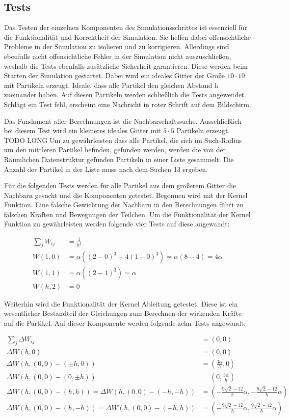 \documentclass[a4paper, 12pt]{article}
\begin{document}
\subsection{Tests}
Das Testen der einzelnen Komponenten des Simulationsschrittes ist essenziell für die Funktionalität und Korrektheit der Simulation. Sie helfen dabei offensichtliche Probleme in der Simulation zu isolieren und zu korrigieren. Allerdings sind ebenfalls nicht offensichtliche Fehler in der Simulation nicht auszuschließen, weshalb die Tests ebenfalls zusätzliche Sicherheit garantieren. Diese werden beim Starten der Simulation gestartet. Dabei wird ein ideales Gitter der Größe  $10 \cdot 10$  mit Partikeln erzeugt. \glqq Ideale\grqq{}, dass alle Partikel den gleichen Abstand h zueinander haben. Auf diesen Partikeln werden schließlich die Tests angewendet. Schlägt ein Test fehl, erscheint eine Nachricht in roter Schrift auf dem Bildschirm. 

Das Fundament aller Berechnungen ist die Nachbarschaftssuche. Ausschließlich bei diesem Test wird ein kleineres ideales Gitter mit $5 \cdot 5$ Partikeln erzeugt. TODO LONG Um zu gewährleisten dass alle Partikel, die sich im Such-Radius um den mittleren Partikel befinden, gefunden werden, werden die von der Räumlichen Datenstruktur gefunden Partikeln in einer Liste gesammelt. Die Anzahl der Partikel in der Liste muss nach dem Suchen 13 ergeben.

Für die folgenden Tests werden für alle Partikel aus dem größerem Gitter die Nachbarn gesucht und die Komponenten getestet. 
Begonnen wird mit der Kernel Funktion. Eine falsche Gewichtung der Nachbarn in den Berechnungen führt zu falschen Kräften und Bewegungen der Teilchen. Um die Funktionalität der Kernel Funktion zu gewährleisten werden folgende vier Tests auf diese angewandt:

\begin{align*}
	\sum_{j} W_{ij} &= \frac{1}{h^2}\\
	W(1, 0) &= \alpha ((2-0)^3 - 4(1-0)^3) = \alpha (8 - 4) = 4\alpha\\
	W(1, 1) &= \alpha ((2-1)^3) = \alpha\\
	W(h, 2) &= 0
\end{align*}

Weiterhin wird die Funktionalität der Kernel Ableitung getestet. Diese ist ein wesentlicher Bestandteil der Gleichungen zum Berechnen der wirkenden Kräfte auf die Partikel. Auf dieser Komponente werden folgende zehn Tests angewandt:

\begin{align*}
	\sum_{j} \Delta W_{ij} &= (0, 0)\\
	\Delta W(h, 0) &= (0, 0)\\
	\Delta W(h, (0, 0) - (\pm h, 0)) &= (\frac{3\alpha}{h}, 0)\\
	\Delta W(h, (0, 0) - (0, \pm h)) &= (0, \frac{3\alpha}{h})\\
	\Delta W(h, (0, 0) - (h, h)) = \Delta W(h, (0, 0) - (- h, - h))&= (-\frac{9\sqrt{2} - 12}{h} \alpha,-\frac{9\sqrt{2} - 12}{h} \alpha)\\
	\Delta W(h, (0, 0) - (h, -h)) = \Delta W(h, (0, 0) - (-h, h)) &= (-\frac{9\sqrt{2} - 12}{h} \alpha,\frac{9\sqrt{2} - 12}{h} \alpha)
\end{align*}
\end{document}
